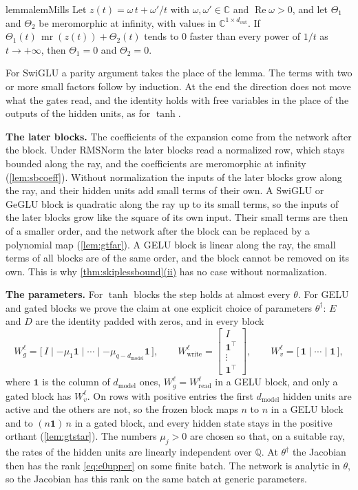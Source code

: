 \documentclass[10pt]{article}
\theoremstyle{definition}
\theoremstyle{remark}
\newcommand{\Wread}{W_{\mathrm{read}}}
\newcommand{\Wwrite}{W_{\mathrm{write}}}
\newcommand{\dm}{d_{\mathrm{model}}}
\newcommand{\para}[1]{\smallskip\noindent\textbf{#1}\hspace{0.5em}}
\DeclareRobustCommand{\cpref}[2]{\hyperref[#1:#2]{\cref*{#1}(#2)}}
\begin{document}
\begin{restatable}{lemma}{lemMills}\label{lem:e0nomero}
Let $z(t) = \omega\,t + \omega'/t$ with $\omega, \omega' \in \mathbb C$ and $\operatorname{Re}\omega > 0$, and let $\Theta_1$ and $\Theta_2$ be meromorphic at infinity, with values in $\mathbb C^{1\times d_{\mathrm{out}}}$. If $\Theta_1(t)\,\operatorname{mr}(z(t)) + \Theta_2(t)$ tends to $0$ faster than every power of $1/t$ as $t \to +\infty$, then $\Theta_1 = 0$ and $\Theta_2 = 0$.
\end{restatable}

For SwiGLU a parity argument takes the place of the lemma. The terms with two or more small factors follow by induction. At the end the direction does not move what the gates read, and the identity holds with free variables in the place of the outputs of the hidden units, as for $\tanh$.

\para{The later blocks.} The coefficients of the expansion come from the network after the block. Under RMSNorm the later blocks read a normalized row, which stays bounded along the ray, and the coefficients are meromorphic at infinity (\cref{lem:sbcoeff}). Without normalization the inputs of the later blocks grow along the ray, and their hidden units add small terms of their own. A SwiGLU or GeGLU block is quadratic along the ray up to its small terms, so the inputs of the later blocks grow like the square of its own input. Their small terms are then of a smaller order, and the network after the block can be replaced by a polynomial map (\cref{lem:gtfar}). A GELU block is linear along the ray, the small terms of all blocks are of the same order, and the block cannot be removed on its own. This is why \cpref{thm:skiplessbound}{ii} has no case without normalization.

\para{The parameters.} For $\tanh$ blocks the step holds at almost every $\theta$. For GELU and gated blocks we prove the claim at one explicit choice of parameters $\theta^\dagger$: $E$ and $D$ are the identity padded with zeros, and in every block
\[
W_g^{\ell} = \big[\,I \;\big|\; {-\mu_1\mathbf 1} \;\big|\; \cdots \;\big|\; {-\mu_{q-\dm}\mathbf 1}\,\big], \qquad \Wwrite^{\ell} = \begin{bmatrix} I \\ \mathbf 1^\top \\[-3pt] \vdots \\ \mathbf 1^\top \end{bmatrix}, \qquad W_v^{\ell} = \big[\,\mathbf 1 \;\big|\; \cdots \;\big|\; \mathbf 1\,\big] ,
\]
where $\mathbf 1$ is the column of $\dm$ ones, $W_g^{\ell} = \Wread^{\ell}$ in a GELU block, and only a gated block has $W_v^{\ell}$. On rows with positive entries the first $\dm$ hidden units are active and the others are not, so the frozen block maps $n$ to $n$ in a GELU block and to $(n\mathbf 1)\,n$ in a gated block, and every hidden state stays in the positive orthant (\cref{lem:gtstar}). The numbers $\mu_j > 0$ are chosen so that, on a suitable ray, the rates of the hidden units are linearly independent over $\mathbb Q$. At $\theta^\dagger$ the Jacobian then has the rank \eqref{eq:e0upper} on some finite batch. The network is analytic in $\theta$, so the Jacobian has this rank on the same batch at generic parameters.
\end{document}
